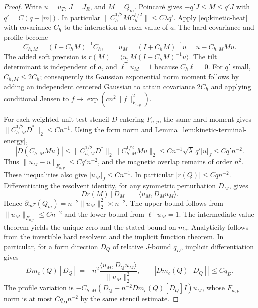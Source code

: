 \documentclass[11pt]{article}
\theoremstyle{definition}
\begin{document}
\begin{proof}
Write \(u=u_T\), \(J=J_R\), and \(M=Q_m\).
Poincar\'e gives
\(-q'J\le M\le q'J\) with \(q'=C(q+|m|)\).
In particular
\(\|C_h^{1/2} M C_h^{1/2}\|\le C\lambda q'\).
Apply \eqref{eq:kinetic-heat} with covariance \(C_h\)
to the interaction at each value of \(a\). The hard
covariance and profile become
\begin{equation}
 C_{h,M}=(I+C_h M)^{-1}C_h,\qquad
 u_M=(I+C_h M)^{-1}u=u-C_{h,M} M u .
\end{equation}
The added soft precision is
\(r(M)=\langle u,M(I+C_h M)^{-1}u\rangle\).
The tilt determinant is independent of \(a\), and
\(\ell^{\mathsf T}u_M=1\) because \(C_h\ell=0\).
For \(q'\) small, \(C_{h,M}\le 2 C_h\); consequently its
Gaussian exponential norm moment follows by adding an
independent centered Gaussian to attain covariance \(2C_h\)
and applying conditional Jensen to
\(f\mapsto\exp(c n^2\|f\|_{F_{n,p}}^2)\).

For each weighted unit test stencil \(D\) entering
\(F_{n,p}\), the same hard moment gives
\(\|C_{h,M}^{1/2}D^*\|_2\le C n^{-1}\).
Using the form norm and Lemma~\ref{lem:kinetic-terminal-energy},
\begin{equation}
 |D(C_{h,M}Mu)|\le
 \|C_{h,M}^{1/2}D^*\|_2
 \|C_{h,M}^{1/2}Mu\|_2
 \le C n^{-1}\sqrt{\lambda}\,q' |u|_J
 \le C q'n^{-2}.
\end{equation}
Thus \(\|u_M-u\|_{F_{n,p}}\le C q'n^{-2}\), and the
magnetic overlap remains of order \(n^2\). These inequalities
also give \(|u_M|_J\le C n^{-1}\). In particular
\(|r(Q)|\le C q n^{-2}\). Differentiating the resolvent
identity, for any symmetric perturbation \(D_M\), gives
\begin{equation}
 D r(M)[D_M]=\langle u_M,D_M u_M\rangle .
\end{equation}
Hence \(\partial_m r(Q_m)=n^{-2}\|u_M\|_2^2\asymp n^{-2}\).
The upper bound follows from \(\|u_M\|_{F_{n,p}}\le C n^{-2}\)
and the lower bound from \(\ell^{\mathsf T}u_M=1\).
The intermediate value theorem yields the unique zero and
the stated bound on \(m_c\). Analyticity follows from the
invertible hard resolvent and the implicit function theorem.
In particular, for a form direction \(D_Q\) of relative
\(J\)-bound \(q_D\), implicit differentiation gives
\begin{equation}
 Dm_c(Q)[D_Q]
 =-n^2\frac{\langle u_M,D_Q u_M\rangle}{\|u_M\|_2^2},
 \qquad |Dm_c(Q)[D_Q]|\le C q_D.
\end{equation}
The profile variation is
\(-C_{h,M}(D_Q+n^{-2}Dm_c(Q)[D_Q]I)u_M\), whose
\(F_{n,p}\) norm is at most \(C q_D n^{-2}\) by the same
stencil estimate.


\end{proof}
\end{document}
